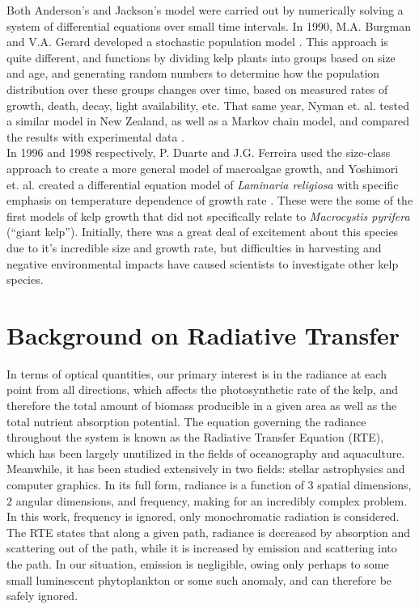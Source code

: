 Both Anderson's and Jackson's model were carried out by numerically solving a system of differential equations over small time intervals.
In 1990, M.A. Burgman and V.A. Gerard developed a stochastic population model \cite{burgman_stage-structured_1990}.
This approach is quite different, and functions by dividing kelp plants into groups based on size and age, and generating random numbers to determine how the population distribution over these groups changes over time, based on measured rates of growth, death, decay, light availability, etc.
That same year, Nyman et. al. tested a similar model in New Zealand, as well as a Markov chain model, and compared the results with experimental data \cite{nyman_macrocystis_1990}. \\[-0.75em]

In 1996 and 1998 respectively, P. Duarte and J.G. Ferreira used the size-class approach to create a more general model of macroalgae growth, and Yoshimori et. al. created a differential equation model of \textit{Laminaria religiosa} with specific emphasis on temperature dependence of growth rate \cite{duarte_model_1997,yoshimori_mathematical_1998}.
These were the some of the first models of kelp growth that did not specifically relate to \textit{Macrocystis pyrifera} (``giant kelp''). 
Initially, there was a great deal of excitement about this species due to it's incredible size and growth rate, but difficulties in harvesting and negative environmental impacts have caused scientists to investigate other kelp species. \\[-0.75em]

\section{Background on Radiative Transfer}
In terms of optical quantities, our primary interest is in the radiance at each point from all directions, which affects the photosynthetic rate of the kelp, and therefore the total amount of biomass producible in a given area as well as the total nutrient absorption potential.
The equation governing the radiance throughout the system is known as the Radiative Transfer Equation (RTE), which has been largely unutilized in the fields of oceanography and aquaculture.
Meanwhile, it has been studied extensively in two fields: stellar astrophysics and computer graphics.
In its full form, radiance is a function of 3 spatial dimensions, 2 angular dimensions, and frequency, making for an incredibly complex problem.
In this work, frequency is ignored, only monochromatic radiation is considered.
The RTE states that along a given path, radiance is decreased by absorption and scattering out of the path, while it is increased by emission and scattering into the path.
In our situation, emission is negligible, owing only perhaps to some small luminescent phytoplankton or some such anomaly, and can therefore be safely ignored.

